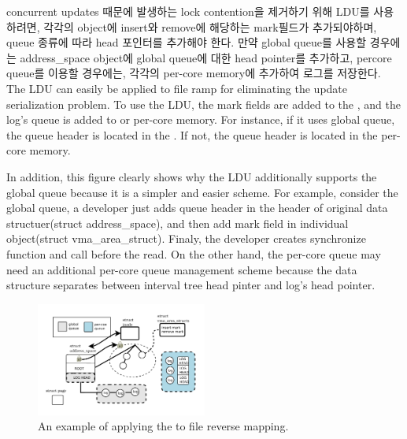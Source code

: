 \ifkor
concurrent updates 때문에 발생하는 lock contention을 제거하기 위해 LDU를 사용하려면,
각각의 object에 insert와 remove에 해당하는 mark필드가 추가되야하며, queue 종류에 따라 head 포인터를
추가해야 한다. 
만약 global queue를 사용할 경우에는 address\_space object에 global queue에 대한
head pointer를 추가하고, percore queue를 이용할 경우에는, 각각의 per-core memory에 추가하여 로그를 
저장한다. 
\else
The LDU can easily be applied to file ramp for eliminating the update
serialization problem.
To use the LDU, the mark fields are added to the , and the log's queue is added to  or per-core
memory.
For instance, if it uses global queue, the queue header is located in the
. If not, the queue header is located in the
per-core memory.
\fi

\ifkor
\else
In addition, this figure clearly shows why the LDU additionally supports the
global queue because it is a simpler and easier scheme.
For example, consider the global queue, a developer just adds queue header in
the header of original data structuer(struct address\_space), and then add mark
field in individual object(struct vma\_area\_struct).
Finaly, the developer creates synchronize function and call before the
read.
On the other hand, the per-core queue may need an additional per-core
queue management scheme because the data structure separates between interval
tree head pinter and log's head pointer.
\fi

\begin{figure}[tb]
  \begin{center}
     \includegraphics[width=0.5\textwidth,height=0.5\textheight,keepaspectratio]{fig/file_rmap}
  \end{center}
  \caption{An example of applying the  to file reverse mapping. }
  \label{fig:fileramp}
\end{figure}



